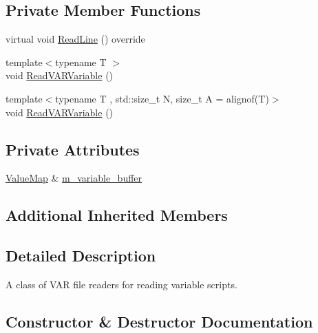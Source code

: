 \subsection*{Private Member Functions}
\begin{DoxyCompactItemize}
\item 
virtual void \mbox{\hyperlink{classmage_1_1loader_1_1_v_a_r_reader_af9a470c013179401016300ef85df6b3a}{Read\+Line}} () override
\item 
{\footnotesize template$<$typename T $>$ }\\void \mbox{\hyperlink{classmage_1_1loader_1_1_v_a_r_reader_a253cd885c8527453feedfe619fb684e1}{Read\+V\+A\+R\+Variable}} ()
\item 
{\footnotesize template$<$typename T , std\+::size\+\_\+t N, size\+\_\+t A = alignof(\+T)$>$ }\\void \mbox{\hyperlink{classmage_1_1loader_1_1_v_a_r_reader_aa27db2b3ba9c66dbdd2c75c6aba1848c}{Read\+V\+A\+R\+Variable}} ()
\end{DoxyCompactItemize}
\subsection*{Private Attributes}
\begin{DoxyCompactItemize}
\item 
\mbox{\hyperlink{namespacemage_a3a4b59e486babe3ec78455f9ee0d4beb}{Value\+Map}} \& \mbox{\hyperlink{classmage_1_1loader_1_1_v_a_r_reader_ae5f9a2c2d74f38bce7d52ea359a52c52}{m\+\_\+variable\+\_\+buffer}}
\end{DoxyCompactItemize}
\subsection*{Additional Inherited Members}


\subsection{Detailed Description}
A class of V\+AR file readers for reading variable scripts. 

\subsection{Constructor \& Destructor Documentation}
\mbox{\label{classmage_1_1loader_1_1_v_a_r_reader_a00b5cd2b84315925bd57920145893b7b}} 
